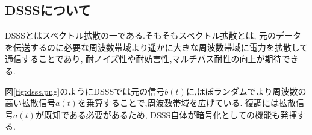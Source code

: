 \subsection{DSSSについて\cite{dsss}}
DSSSとはスペクトル拡散の一である.そもそもスペクトル拡散とは,
元のデータを伝送するのに必要な周波数帯域より遥かに大きな周波数帯域に電力を拡散して通信することであり,
耐ノイズ性や耐妨害性,マルチパス耐性の向上が期待できる.

図\ref{fig:dsss.png}のようにDSSSでは元の信号$b(t)$に,ほぼランダムでより周波数の高い拡散信号$a(t)$を乗算することで,周波数帯域を広げている.
復調には拡散信号$a(t)$が既知である必要があるため, DSSS自体が暗号化としての機能も発揮する.
